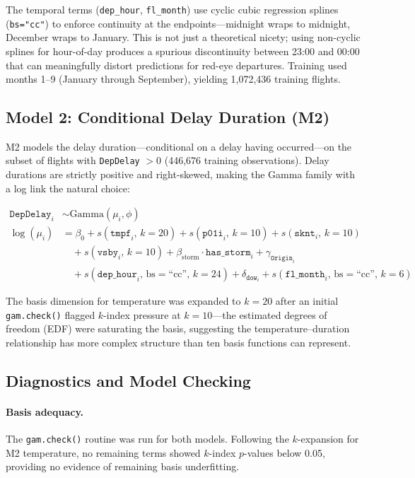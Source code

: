 \documentclass[12pt, a4paper]{article}
\begin{document}
\noindent The temporal terms (\texttt{dep\_hour}, \texttt{fl\_month}) use cyclic cubic regression splines (\texttt{bs="cc"}) to enforce continuity at the endpoints---midnight wraps to midnight, December wraps to January. This is not just a theoretical nicety; using non-cyclic splines for hour-of-day produces a spurious discontinuity between 23:00 and 00:00 that can meaningfully distort predictions for red-eye departures. Training used months 1--9 (January through September), yielding 1,072,436 training flights.

\subsection{Model 2: Conditional Delay Duration (M2)}

M2 models the delay duration---conditional on a delay having occurred---on the subset of flights with \texttt{DepDelay} $> 0$ (446,676 training observations). Delay durations are strictly positive and right-skewed, making the Gamma family with a log link the natural choice:

\begin{align}
    \texttt{DepDelay}_i &\sim \text{Gamma}(\mu_i, \phi) \nonumber \\
    \log(\mu_i) &= \beta_0 + s(\texttt{tmpf}_i,\, k=20) + s(\texttt{p01i}_i,\, k=10) + s(\texttt{sknt}_i,\, k=10) \nonumber \\
    &\quad + s(\texttt{vsby}_i,\, k=10) + \beta_{\text{storm}} \cdot \texttt{has\_storm}_i + \gamma_{\texttt{Origin}_i} \nonumber \\
    &\quad + s(\texttt{dep\_hour}_i,\, \text{bs}=\text{``cc''},\, k=24) + \delta_{\texttt{dow}_i} + s(\texttt{fl\_month}_i,\, \text{bs}=\text{``cc''},\, k=6)
    \label{eq:m2}
\end{align}

\noindent The basis dimension for temperature was expanded to $k=20$ after an initial \texttt{gam.check()} flagged $k$-index pressure at $k=10$---the estimated degrees of freedom (EDF) were saturating the basis, suggesting the temperature--duration relationship has more complex structure than ten basis functions can represent.

\subsection{Diagnostics and Model Checking}

\paragraph{Basis adequacy.} The \texttt{gam.check()} routine was run for both models. Following the $k$-expansion for M2 temperature, no remaining terms showed $k$-index $p$-values below 0.05, providing no evidence of remaining basis underfitting.
\end{document}

